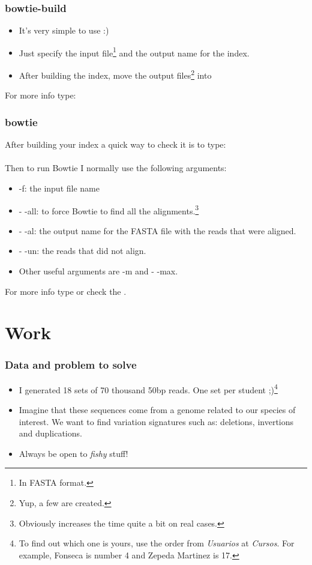 \begin{frame}[allowframebreaks]
  \frametitle{bowtie-build}
  \begin{itemize}
  \item It's very simple to use :)
  \item Just specify the input file\footnote{In FASTA format.} and the output name for the index.
  \item After building the index, move the output files\footnote{Yup, a few are created.} into 
  \end{itemize}
  For more info type: 
\end{frame}

\begin{frame}[allowframebreaks]
  \frametitle{bowtie}
  After building your index a quick way to check it is to type: \\  \\ Then to run Bowtie I normally use the following arguments:
  \begin{itemize}
  \item \alert{-f}: the input file name
  \item \alert{- -all}: to force Bowtie to find all the alignments.\footnote{Obviously increases the time quite a bit on real cases.}
  \item \alert{- -al}: the output name for the FASTA file with the reads that were aligned.
  \item \alert{- -un}: the reads that did not align.
  \item Other useful arguments are \alert{-m} and \alert{- -max}.
  \end{itemize}
  For more info type  or check the .
\end{frame}

\section{Work}

\begin{frame}[allowframebreaks]
  \frametitle{Data and problem to solve}
  \begin{itemize}
  \item I generated 18 sets of 70 thousand 50bp reads. One set per student ;)\footnote{To find out which one is yours, use the order from \emph{Usuarios} at \emph{Cursos}. For example, Fonseca is number 4 and Zepeda Martinez is 17.}
  \item Imagine that these sequences come from a genome related to our species of interest. We want to find variation signatures such as: deletions, invertions and duplications.
  \item Always be open to \emph{fishy} stuff!
  \end{itemize}
\end{frame}

